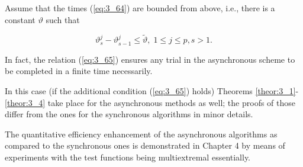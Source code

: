 	Assume that the times  (\ref{eq:3_64}) are bounded from above, i.e., there is a constant \textit{$\vartheta$}  such that 
	
	\begin{equation}
	\label{eq:3_65}
	\vartheta _{s}^{j} -\vartheta _{s-1}^{j} \le \tilde{\vartheta },\; 1\le j\le p,s>1.
	\end{equation}
	
	In fact, the relation  (\ref{eq:3_65}) ensures any trial in the asynchronous scheme to be completed in a finite time necessarily.
	
	In this case (if the additional condition  (\ref{eq:3_65}) holds) Theorems \ref{theor:3_1}-\ref{theor:3_4} take place for the asynchronous methods as well; the proofs of those differ from the ones for the synchronous algorithms in minor details. 
	
	The quantitative efficiency enhancement of the asynchronous algorithms as compared to the synchronous ones is demonstrated in Chapter 4 by means of experiments with the test functions being multiextremal essentially. 
	
	
	
